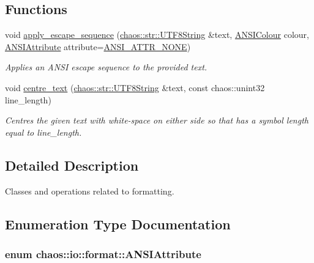 \subsection*{Functions}
\begin{DoxyCompactItemize}
\item 
void \hyperlink{namespacechaos_1_1io_1_1format_a005869cc85ba6d9b0fcfad31cf56bda7}{apply\-\_\-escape\-\_\-sequence} (\hyperlink{classchaos_1_1str_1_1_u_t_f8_string}{chaos\-::str\-::\-U\-T\-F8\-String} \&text, \hyperlink{namespacechaos_1_1io_1_1format_aa30dcff2478ffc94e33504c8886a5b1a}{A\-N\-S\-I\-Colour} colour, \hyperlink{namespacechaos_1_1io_1_1format_af01119682ec0bc616b49641e0c2a7ccf}{A\-N\-S\-I\-Attribute} attribute=\hyperlink{namespacechaos_1_1io_1_1format_af01119682ec0bc616b49641e0c2a7ccfa3154b286513beb167bb516ea15f1cfb5}{A\-N\-S\-I\-\_\-\-A\-T\-T\-R\-\_\-\-N\-O\-N\-E})
\begin{DoxyCompactList}\small\item\em Applies an A\-N\-S\-I escape sequence to the provided text. \end{DoxyCompactList}\item 
void \hyperlink{namespacechaos_1_1io_1_1format_a1383dce806dc531aefb9f6dcb78d4517}{centre\-\_\-text} (\hyperlink{classchaos_1_1str_1_1_u_t_f8_string}{chaos\-::str\-::\-U\-T\-F8\-String} \&text, const chaos\-::unint32 line\-\_\-length)
\begin{DoxyCompactList}\small\item\em Centres the given text with white-\/space on either side so that has a symbol length equal to line\-\_\-length. \end{DoxyCompactList}\end{DoxyCompactItemize}


\subsection{Detailed Description}
Classes and operations related to formatting. 

\subsection{Enumeration Type Documentation}
\hypertarget{namespacechaos_1_1io_1_1format_af01119682ec0bc616b49641e0c2a7ccf}{
\subsubsection[{A\-N\-S\-I\-Attribute}]{\setlength{\rightskip}{0pt plus 5cm}enum {\bf chaos\-::io\-::format\-::\-A\-N\-S\-I\-Attribute}}}\label{namespacechaos_1_1io_1_1format_af01119682ec0bc616b49641e0c2a7ccf}


